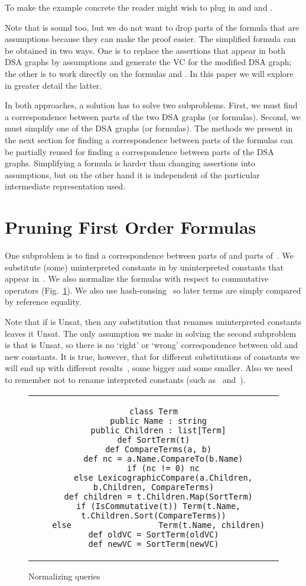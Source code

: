 \documentclass{llncs}
\def\unsat{{\sc Unsat}}
\begin{document}
\noindent
To make the example concrete the reader might wish to plug in
 and  and .

Note that  is sound too, but we
do not want to drop parts of the formula that are assumptions
because they can make the proof easier. The simplified formula 
can be obtained in
two ways. One is to replace the assertions that appear in both
DSA graphs by assumptions and generate the VC for the modified
DSA graph; the other is to work directly on the formulas 
 and . In this paper we will explore in greater 
detail the latter. 

In both approaches, a solution has to solve
two subproblems. First, we must find a correspondence between
parts of the two DSA graphs (or formulas). Second, we must
simplify one of the DSA graphs (or formulas). The methods we
present in the next section for finding a correspondence
between parts of the formulas can be partially reused for
finding a correspondence between parts of the DSA graphs.
Simplifying a formula is harder than changing assertions into
assumptions, but on the other hand it is independent of the 
particular intermediate representation used.

\section{Pruning First Order Formulas}
\label{sec:prune}

One subproblem is to find a correspondence between parts
of  and parts of~. We substitute (some) 
uninterpreted constants in  by uninterpreted 
constants that appear in~. We also normalize
the formulas with respect to commutative operators
(Fig.~\ref{fig:alg_sort}). We also use 
hash-consing~\cite{hashcons_old,hashcons_ml} so later terms 
are simply compared by reference equality.

Note that if  is \unsat, then any
substitution that renames uninterpreted constants leaves it \unsat.
The only assumption we make in solving the second subproblem
is that  is \unsat, so there is no `right' or `wrong'
correspondence between old and new constants. It is true, 
however, that for different substitutions of constants we 
will end up with different results~, some bigger 
and some smaller. Also we need to remember not to rename 
interpreted constants (such as~ and~).

\begin{figure}[t]
  \centering
\begin{tabular}{c}
\begin{lstlisting}
class Term
  public Name : string
  public Children : list[Term]
def SortTerm(t)
  def CompareTerms(a, b)
    def nc = a.Name.CompareTo(b.Name)
    if (nc != 0) nc
    else LexicographicCompare(a.Children, b.Children, CompareTerms)
  def children = t.Children.Map(SortTerm)
  if (IsCommutative(t)) Term(t.Name, t.Children.Sort(CompareTerms))
  else                  Term(t.Name, children)
def oldVC = SortTerm(oldVC)
def newVC = SortTerm(newVC)
\end{lstlisting}
\end{tabular}
  \caption{Normalizing queries}
  \label{fig:alg_sort}
\end{figure}
\end{document}
